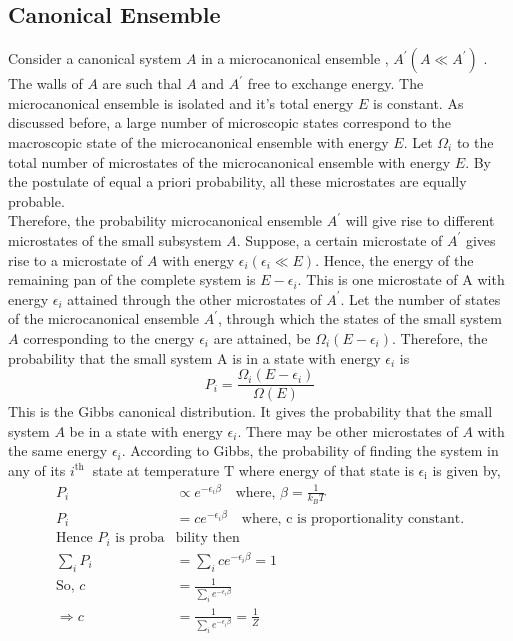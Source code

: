 \subsection{Canonical Ensemble}
Consider a canonical system $A$ in a microcanonical ensemble , $A^{\prime}\left(A \ll A^{\prime}\right)$ . The walls of $A$ are such thal $A$ and $A^{\prime}$ free to exchange energy. The microcanonical ensemble is isolated and it's total energy $E$ is constant. As discussed before, a large number of microscopic states correspond to the macroscopic state of the microcanonical ensemble with energy $E$. Let $\Omega_{i}$ to the total number of microstates of the microcanonical ensemble with energy $E$. By the postulate of equal a priori probability, all these microstates are equally probable. \\Therefore, the probability
microcanonical ensemble $A^{\prime}$ will give rise to different microstates of the small subsystem $A$. Suppose, a certain microstate of $A^{\prime}$ gives rise to a microstate of $A$ with energy $\epsilon_{i}\left(\epsilon_{i} \ll E\right)$. Hence, the energy of the remaining pan of the complete system is $E-\epsilon_{i}$. This is one microstate of A with energy $\epsilon_{i}$ attained through the other microstates of $A^{\prime}$. Let the number of states of the microcanonical ensemble $A^{\prime}$, through which the states of the small system $A$ corresponding to the cnergy $\epsilon_{i}$ are attained, be $\Omega_{i}\left(E-\epsilon_{i}\right)$. Therefore, the probability that the small system A is in a state with energy $\epsilon_{i}$ is
\begin{equation*}
P_{i}=\frac{\Omega_{i}\left(E-\epsilon_{i}\right)}{\Omega(E)}
\end{equation*}
This is the Gibbs canonical distribution. It gives the probability that the small system $A$ be in a state with energy $\epsilon_{i}$. There may be other microstates of $A$ with the same energy $\epsilon_{i}$.
According to Gibbs, the probability of finding the system in any of its $i^{\text {th }}$ state at temperature $\mathrm{T}$ where energy of that state is $\epsilon_{\mathrm{i}}$ is given by,
\begin{align*}
P_{i} &\propto e^{-\epsilon_{i} \beta} \quad \text{where, }\beta=\frac{1}{k_{B} T}\\
P_{i}&=c e^{-\epsilon_{i} \beta}\quad \text{where, } \mathrm{c } \text{ is proportionality constant.}\\
\text{Hence $P_{i}$ is proba}&\text{bility then}\\
\sum_{i} P_{i}&=\sum_{i} c e^{-\epsilon_{i} \beta}=1 \\ \text {So, } c&=\frac{1}{\sum_{i} e^{-\epsilon_{i} \beta}}\\ \Rightarrow c&=\frac{1}{\sum_{i} e^{-\epsilon_{i} \beta}}=\frac{1}{Z}
\end{align*}   

